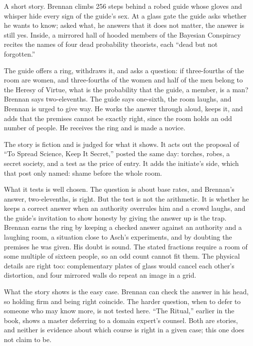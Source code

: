 \begin{afterword}
\summaryhead

A short story. Brennan climbs 256 steps behind a robed guide whose gloves and whisper hide every sign of the guide's sex. At a glass gate the guide asks whether he wants to know; asked what, he answers that it does not matter, the answer is still yes. Inside, a mirrored hall of hooded members of the Bayesian Conspiracy recites the names of four dead probability theorists, each ``dead but not forgotten.''

The guide offers a ring, withdraws it, and asks a question: if three-fourths of the room are women, and three-fourths of the women and half of the men belong to the Heresy of Virtue, what is the probability that the guide, a member, is a man? Brennan says two-elevenths. The guide says one-sixth, the room laughs, and Brennan is urged to give way. He works the answer through aloud, keeps it, and adds that the premises cannot be exactly right, since the room holds an odd number of people. He receives the ring and is made a novice.

\responsehead

The story is fiction and is judged for what it shows. It acts out the proposal of ``To Spread Science, Keep It Secret,'' posted the same day: torches, robes, a secret society, and a test as the price of entry. It adds the initiate's side, which that post only named: shame before the whole room.

What it tests is well chosen. The question is about base rates, and Brennan's answer, two-elevenths, is right. But the test is not the arithmetic. It is whether he keeps a correct answer when an authority overrules him and a crowd laughs, and the guide's invitation to show honesty by giving the answer up is the trap. Brennan earns the ring by keeping a checked answer against an authority and a laughing room, a situation close to Asch's experiments, and by doubting the premises he was given. His doubt is sound. The stated fractions require a room of some multiple of sixteen people, so an odd count cannot fit them. The physical details are right too: complementary plates of glass would cancel each other's distortion, and four mirrored walls do repeat an image in a grid.

What the story shows is the easy case. Brennan can check the answer in his head, so holding firm and being right coincide. The harder question, when to defer to someone who may know more, is not tested here. ``The Ritual,'' earlier in the book, shows a master deferring to a domain expert's counsel. Both are stories, and neither is evidence about which course is right in a given case; this one does not claim to be.


\end{afterword}
